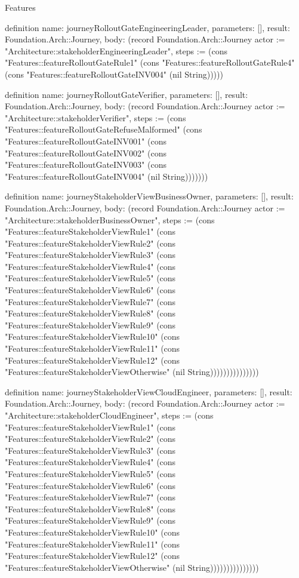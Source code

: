 \begin{lexlean}{Features}
\begin{semanticmodule}
definition{
  name: journeyRolloutGateEngineeringLeader,
  parameters: [],
  result: Foundation.Arch::Journey,
  body: (record Foundation.Arch::Journey {actor := "Architecture::stakeholderEngineeringLeader", steps := (cons "Features::featureRolloutGateRule1" (cons "Features::featureRolloutGateRule4" (cons "Features::featureRolloutGateINV004" (nil String))))})
}

definition{
  name: journeyRolloutGateVerifier,
  parameters: [],
  result: Foundation.Arch::Journey,
  body: (record Foundation.Arch::Journey {actor := "Architecture::stakeholderVerifier", steps := (cons "Features::featureRolloutGateRefuseMalformed" (cons "Features::featureRolloutGateINV001" (cons "Features::featureRolloutGateINV002" (cons "Features::featureRolloutGateINV003" (cons "Features::featureRolloutGateINV004" (nil String))))))})
}

definition{
  name: journeyStakeholderViewBusinessOwner,
  parameters: [],
  result: Foundation.Arch::Journey,
  body: (record Foundation.Arch::Journey {actor := "Architecture::stakeholderBusinessOwner", steps := (cons "Features::featureStakeholderViewRule1" (cons "Features::featureStakeholderViewRule2" (cons "Features::featureStakeholderViewRule3" (cons "Features::featureStakeholderViewRule4" (cons "Features::featureStakeholderViewRule5" (cons "Features::featureStakeholderViewRule6" (cons "Features::featureStakeholderViewRule7" (cons "Features::featureStakeholderViewRule8" (cons "Features::featureStakeholderViewRule9" (cons "Features::featureStakeholderViewRule10" (cons "Features::featureStakeholderViewRule11" (cons "Features::featureStakeholderViewRule12" (cons "Features::featureStakeholderViewOtherwise" (nil String))))))))))))))})
}

definition{
  name: journeyStakeholderViewCloudEngineer,
  parameters: [],
  result: Foundation.Arch::Journey,
  body: (record Foundation.Arch::Journey {actor := "Architecture::stakeholderCloudEngineer", steps := (cons "Features::featureStakeholderViewRule1" (cons "Features::featureStakeholderViewRule2" (cons "Features::featureStakeholderViewRule3" (cons "Features::featureStakeholderViewRule4" (cons "Features::featureStakeholderViewRule5" (cons "Features::featureStakeholderViewRule6" (cons "Features::featureStakeholderViewRule7" (cons "Features::featureStakeholderViewRule8" (cons "Features::featureStakeholderViewRule9" (cons "Features::featureStakeholderViewRule10" (cons "Features::featureStakeholderViewRule11" (cons "Features::featureStakeholderViewRule12" (cons "Features::featureStakeholderViewOtherwise" (nil String))))))))))))))})
}


\end{semanticmodule}
\end{lexlean}

